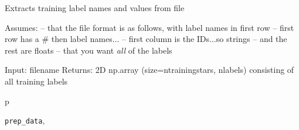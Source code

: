 \documentclass[letterpaper,10pt,english]{sphinxmanual}
\begin{document}

\begin{fulllineitems}
\label{index:prep_data.get_training_labels}
Extracts training label names and values from file

Assumes:
-- that the file format is as follows, with label names in first row
-- first row has a \# then label names...
-- first column is the IDs...so strings
-- and the rest are floats
-- that you want \emph{all} of the labels

Input: filename
Returns: 2D np.array (size=ntrainingstars, nlabels) consisting of all
training labels

\end{fulllineitems}



\renewcommand{\indexname}{Python Module Index}
\begin{theindex}
\def\bigletter#1{{\Large\sffamily#1}\nopagebreak\vspace{1mm}}
\bigletter{p}
\item {\texttt{prep\_data}}, \pageref{index:module-prep_data}
\end{theindex}

\renewcommand{\indexname}{Index}
\printindex
\end{document}
